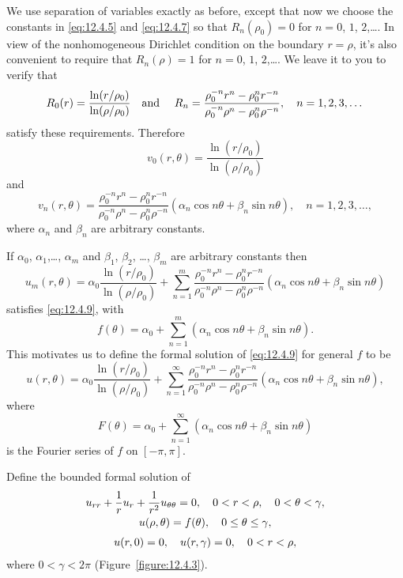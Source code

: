 \begin{examplesolution}
\solution We use separation of variables exactly as before, except that now we choose the constants
in \eqref{eq:12.4.5} and \eqref{eq:12.4.7} so that $R_{n}(\rho_{0})=0$ for $n=0$, $1$, $2$,\dots. In
view of the nonhomogeneous Dirichlet condition on the boundary $r=\rho$, it's also convenient to
require that $R_{n}(\rho)=1$ for $n=0$, $1$, $2$,\dots. We leave it to you to verify that
\[
  R_{0}(r)=\frac{\ln(r/\rho_{0})}{\ln(\rho/\rho_{0})}\mbox{\quad and \quad}R_{n}=\frac{\rho_{0}^{-n}r^{n}-\rho_{0}^{n}r^{-n}}{\rho_{0}^{-n}\rho^{n}-\rho_{0}^{n}\rho^{-n}},\quad n=1,2,3,\dots
\]
satisfy these requirements. Therefore
\[
  v_{0}(r,\theta)=\frac{\ln(r/\rho_{0})}{\ln(\rho/\rho_{0})}
\]
and
\[
  v_{n}(r,\theta)=\frac{\rho_{0}^{-n}r^{n}-\rho_{0}^{n}r^{-n}}{\rho_{0}^{-n}\rho^{n}-\rho_{0}^{n}\rho^{-n}}(\alpha_{n}\cos n\theta+\beta_{n}\sin n\theta), \quad n=1,2,3,\dots,
\]
where $\alpha_{n}$ and $\beta_{n}$ are arbitrary constants.

If $\alpha_{0}$, $\alpha_{1}$,\dots, $\alpha_{m}$ and $\beta_{1}$, $\beta_{2}$, \dots, $\beta_{m}$
are arbitrary constants then
\[
  u_{m}(r,\theta)=\alpha_{0}\frac{\ln(r/\rho_{0})}{\ln(\rho/\rho_{0})}+ \sum_{n=1}^{m}\frac{\rho_{0}^{-n}r^{n}-\rho_{0}^{n}r^{-n}}{\rho_{0}^{-n}\rho^{n}-\rho_{0}^{n}\rho^{-n}}(\alpha_{n}\cos n\theta+\beta_{n}\sin n\theta)
\]
satisfies \eqref{eq:12.4.9}, with
\[
  f(\theta) =\alpha_{0}+\sum_{n=1}^{m}(\alpha_{n}\cos n\theta+\beta_{n}\sin n\theta).
\]
This motivates us to define the formal solution of \eqref{eq:12.4.9} for general $f$ to be
\[
  u(r,\theta)=\alpha_{0}\frac{\ln(r/\rho_{0})}{\ln(\rho/\rho_{0})}+ \sum_{n=1}^{\infty}\frac{\rho_{0}^{-n}r^{n}-\rho_{0}^{n}r^{-n}}{\rho_{0}^{-n}\rho^{n}-\rho_{0}^{n}\rho^{-n}}(\alpha_{n}\cos n\theta+\beta_{n}\sin n\theta),
\]
where
\[
  F(\theta) =\alpha_{0}+\sum_{n=1}^{\infty}(\alpha_{n}\cos n\theta+\beta_{n}\sin n\theta)
\]
is the Fourier series of $f$ on $[-\pi,\pi]$.
\end{examplesolution}

\begin{example}
  \label{example:12.4.3} \rm Define the bounded formal solution of
  \begin{equation}
    \label{eq:12.4.10}
    \begin{array}{c}
      \displaystyle u_{rr}+\frac{1}{r}u_{r}+\frac{1}{r^{2}}u_{\theta\theta}=0,\quad 0<r<\rho,\quad0<\theta<\gamma, \\[2\jot]
      u(\rho,\theta)=f(\theta),\quad0\le\theta\le\gamma,                                                  \\[2\jot]
      u(r,0)=0,\quad u(r,\gamma)=0,\quad0<r<\rho,
    \end{array}
  \end{equation}
  where $0<\gamma<2\pi$ (Figure~\ref{figure:12.4.3}).
\end{example}


